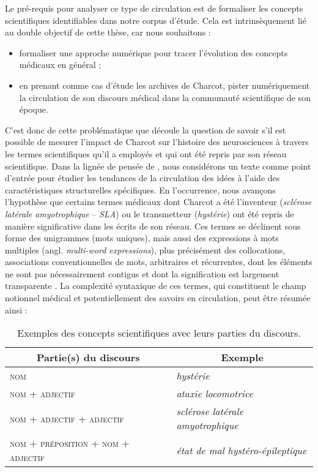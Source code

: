 Le pré-requis pour analyser ce type de circulation est de formaliser les concepts scientifiques identifiables dans notre corpus d'étude.
Cela est intrinsèquement lié au double objectif de cette thèse, car nous souhaitons :
\begin{itemize} 
	\item formaliser une approche numérique pour tracer l'évolution des concepts médicaux en général ;
	\item en prenant comme cas d'étude les archives de Charcot, pister numériquement la circulation de son discours médical dans la communauté scientifique de son époque.
\end{itemize}
\medskip

C'est donc de cette problématique que découle la question de savoir s'il est possible de mesurer l'impact de Charcot sur l'histoire des neurosciences à travers les termes scientifiques qu'il a employés et qui ont été repris par son réseau scientifique. Dans la lignée de pensée de \citet{milia2023}, nous considérons un texte comme point d'entrée pour étudier les tendances de la circulation des idées à l'aide des caractéristiques structurelles spécifiques. En l'occurrence, nous avançons l'hypothèse que certains termes médicaux dont Charcot a été l'inventeur (\textit{sclérose latérale amyotrophique} -- \textit{SLA}) ou le transmetteur (\textit{hystérie}) ont été repris de manière significative dans les écrits de son réseau. Ces termes se déclinent sous forme des unigrammes (mots uniques), mais aussi des expressions à mots multiples (angl. \textit{multi-word expressions}), plus précisément des collocations, \og{}associations conventionnelles de mots, arbitraires et récurrentes, dont les éléments ne sont pas nécessairement contigus et dont la signification est largement transparente\fg{} \citep[p. 96]{nerima2006}. La complexité syntaxique de ces termes, qui constituent le champ notionnel médical et potentiellement des savoirs en circulation, peut être résumée ainsi :
\begin{table}[h]
	\centering
	\begin{tabular}{l|l}
		\multicolumn{1}{c|}{Partie(s) du discours} & \multicolumn{1}{c}{Exemple} \\
		\hline
		\textsc{nom} & \textit{hystérie}\\
		\textsc{nom + adjectif} & \textit{ataxie locomotrice}\\
		\textsc{nom + adjectif + adjectif} & \textit{sclérose latérale amyotrophique}\\
		\textsc{nom + préposition + nom + adjectif} & \textit{état de mal hystéro-épileptique}
	\end{tabular}
	\caption{Exemples des concepts scientifiques avec leurs parties du discours.}
\end{table}

